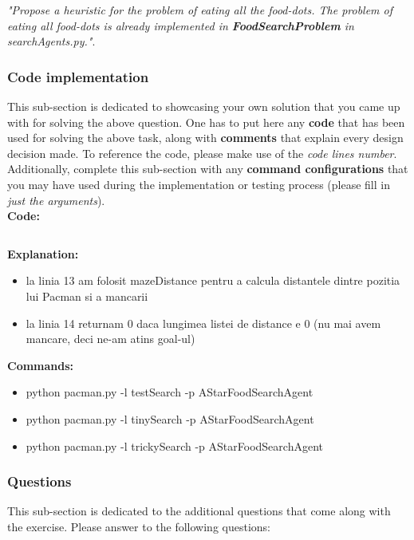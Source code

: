 \textit{"Propose a heuristic for the problem of eating all the food-dots. The problem of eating all food-dots is already implemented in \textbf{FoodSearchProblem} in searchAgents.py."}.


\subsubsection{Code implementation}
This sub-section is dedicated to showcasing your own solution that you came up with for solving the above question. One has to put here any \textbf{code} that has been used for solving the above task, along with \textbf{comments} that explain every design decision made. To reference the code, please make use of the \textit{code lines number}. Additionally, complete this sub-section with any \textbf{command configurations} that you may have used during the implementation or testing process (please fill in \textit{just the arguments}). \\

\textbf{Code:}

\inputminted[linenos]{python}{code/07_find_food.py}


\textbf{Explanation:}
\begin{itemize}
    \setlength\itemsep{0em}
\item la linia 13 am folosit mazeDistance pentru a calcula distantele dintre pozitia lui Pacman si a mancarii
    \item la linia 14 returnam 0 daca lungimea listei de distance e 0 (nu mai avem mancare, deci ne-am atins goal-ul)%

\end{itemize}


\textbf{Commands:}
\begin{itemize}
    \setlength\itemsep{0em}
    \item  python pacman.py -l testSearch -p AStarFoodSearchAgent 
\item python pacman.py -l tinySearch -p AStarFoodSearchAgent
\item python pacman.py -l trickySearch -p AStarFoodSearchAgent %
        
\end{itemize}

\subsubsection{Questions}
This sub-section is dedicated to the additional questions that come along with the exercise. Please answer to the following questions:\newline


